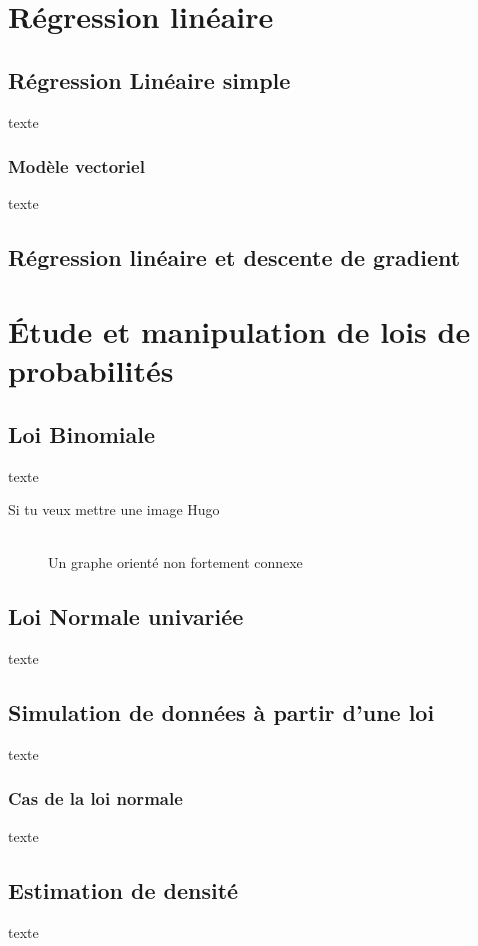 \documentclass{article}      %
\begin{document}
\section{Régression linéaire}
\subsection{Régression Linéaire simple}
texte
\subsubsection{Modèle vectoriel}
texte

\subsection{Régression linéaire et descente de gradient}



\section{Étude et manipulation de lois de probabilités}
\subsection{Loi Binomiale}
texte

Si tu veux mettre une image Hugo
\begin{figure}[H]
    \centering
     \scalebox{.35}{  %
    }
    \\Un graphe orienté non fortement connexe
\end{figure}
\subsection{Loi Normale univariée}
texte
\subsection{Simulation de données à partir d’une loi}
texte

\subsubsection{Cas de la loi normale}
texte

\subsection{Estimation de densité}
texte
\end{document}
